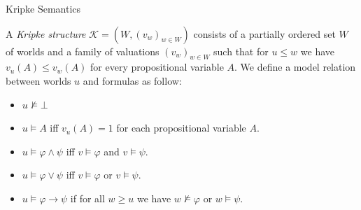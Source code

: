 \documentclass{cubeamer}
\begin{document}
	\begin{frame}{Kripke Semantics}
		\begin{definition}
			A \textit{Kripke structure} $\mathcal K = (W, (v_w)_{w\in W})$ consists of a partially ordered set $W$ of worlds and a family of valuations $(v_w)_{w\in W}$ such that for $u\leq w$ we have $v_u(A)\leq v_w(A)$ for every propositional variable $A$. We define a model relation between worlds $u$ and formulas as follow:
			\begin{itemize}
				\item $u\not\models \bot$
				\item $u\models A$ iff $v_u(A) = 1$ for each propositional variable $A$.
				\item $u\models \varphi\wedge\psi$ iff $v\models\varphi$ and $v\models\psi$.
				\item $u\models\varphi\vee\psi$ iff $v\models\varphi$ or $v\models\psi$.
				\item $u\models\varphi\to \psi$ if for all $w\geq u$ we have $w\not\models\varphi$ or $w\models\psi$.
			\end{itemize}
		\end{definition}
	\end{frame}
	
\end{document}
